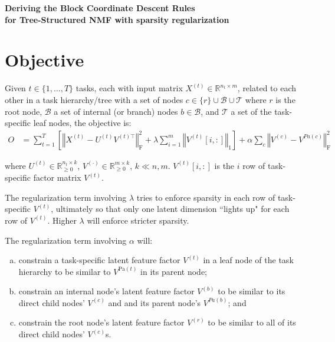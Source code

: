 \documentclass{article}
\begin{document}
\begin{center}
\textbf{\large{Deriving the Block Coordinate Descent Rules \\
for Tree-Structured NMF with sparsity regularization}}
\end{center}
\smallskip
\section*{Objective}
Given $t \in \{1, \dots, T \}$ tasks, each with input matrix $X^{(t)} \in \mathbb{R}^{n_t \times m}$, related to each other in a task hierarchy/tree with a set of nodes $c \in \{ r \}  \cup \mathcal{B} \cup \mathcal{T}$ where $r$ is the root node, $\mathcal{B}$ a set of internal (or branch) nodes $b \in \mathcal{B}$, and $\mathcal{T}$ a set of the task-specific leaf nodes, the objective is:
\begin{align}
O &= 
\sum_{t=1}^T \left[
\left\Vert X^{(t)} - U^{(t)} V^{(t)\top} \right\Vert_\text{F}^2 
+  \lambda \sum_{i=1}^m \left\Vert V^{(t)} [i,:] \right\Vert_1
\right]
+  \alpha \sum_c \left\Vert V^{(c)} - V^{Pa(c)} \right\Vert_\text{F}^2 
\end{align} 

where $U^{(t)} \in \mathbb{R}^{n_t \times k}_{\geq 0}$, $V^{(\cdot)} \in \mathbb{R}^{m \times k}_{\geq 0}$, $k \ll n,m$. $V^{(t)}[i,:]$ is the $i$ row of task-specific factor matrix $V^{(t)}$.

\medskip
The regularization term involving $\lambda$ tries to enforce sparsity in each row of task-specific $V^{(t)}$, ultimately so that only one latent dimension ``lights up" for each row of $V^{(t)}$. Higher $\lambda$ will enforce stricter sparsity.

\medskip
The regularization term involving $\alpha$ will: 
\begin{enumerate}[a.]
\item constrain a task-specific latent feature factor $V^{(t)}$ in a leaf node of the task hierarchy to be similar to $V^{\text{Pa}(t)}$ in its parent node; 
\item constrain an internal node's latent feature factor $V^{(b)}$ to be similar to its direct child nodes' $V^{(c)}$ and and its parent node's $V^{Pa(b)}$; and 
\item constrain the root node's latent feature factor $V^{(r)}$ to be similar to all of its direct child nodes' $V^{(c)}$s.
\end{enumerate}
\end{document}
